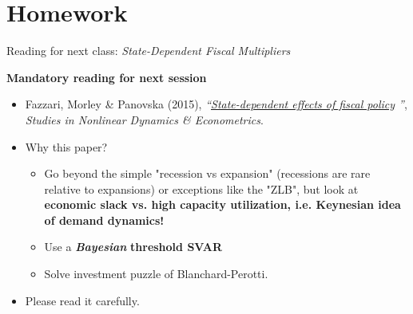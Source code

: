 \documentclass{beamer}
\begin{document}
\section{Homework}

\begin{frame}{Reading for next class: \textit{State-Dependent Fiscal Multipliers}}
\small

\textbf{Mandatory reading for next session}

\medskip
\begin{itemize}
  \item Fazzari, Morley \& Panovska (2015), \emph{“\href{https://www.degruyterbrill.com/document/doi/10.1515/snde-2014-0022/html?srsltid=AfmBOopPTA7blCwc6hBDY3TbsjhVfB8g7dNT6EnjONxQBHTvBh8fdJiD}{State-dependent effects of fiscal policy} ”},
        \textit{Studies in Nonlinear Dynamics \& Econometrics}.
  \item Why this paper?
    \begin{itemize}
      \item Go beyond the simple "recession vs expansion" (recessions are rare relative to expansions) or exceptions like the "ZLB", but look at\textbf{ economic slack vs. high capacity utilization, i.e. Keynesian idea of demand dynamics!}
      \item  Use a\textit{\textbf{ Bayesian}} \textbf{threshold SVAR}
      \item Solve investment puzzle of Blanchard-Perotti. 
    \end{itemize}
  \item Please read it carefully.
\end{itemize}

\end{frame}
\end{document}
